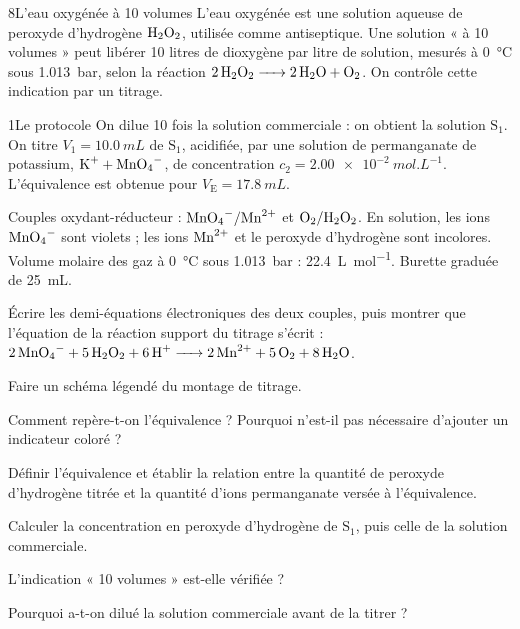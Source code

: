 

\begin{exoBac}{8}{L'eau oxygénée à 10 volumes}
L'eau oxygénée est une solution aqueuse de peroxyde d'hydrogène $\ce{H2O2}$, utilisée comme antiseptique. Une solution « à 10
volumes » peut libérer 10 litres de dioxygène par litre de solution, mesurés à \qty{0}{\degreeCelsius} sous \qty{1,013}{bar}, selon la réaction
$\ce{2 H2O2 -> 2 H2O + O2}$. On contrôle cette indication par un titrage.
\begin{docu}{1}{Le protocole}
On dilue 10 fois la solution commerciale : on obtient la solution $\mathrm{S_1}$. On titre $V_1=\qty{10,0}{mL}$ de $\mathrm{S_1}$, acidifiée, par une
solution de permanganate de potassium, $\ce{K+}+\ce{MnO4-}$, de concentration $c_2=\qty{2,00e-2}{mol.L^{-1}}$. L'équivalence est obtenue
pour $V_\mathrm{E}=\qty{17,8}{mL}$.
\end{docu}
\begin{donnees}
Couples oxydant-réducteur : $\ce{MnO4-}/\ce{Mn^{2+}}$ et $\ce{O2}/\ce{H2O2}$. En solution, les ions $\ce{MnO4-}$ sont violets ; les ions
$\ce{Mn^{2+}}$ et le peroxyde d'hydrogène sont incolores. Volume molaire des gaz à \qty{0}{\degreeCelsius} sous \qty{1,013}{bar} : \qty{22,4}{L.mol^{-1}}.
Burette graduée de \qty{25}{mL}.
\end{donnees}
\begin{questions}
\item Écrire les demi-équations électroniques des deux couples, puis montrer que l'équation de la réaction support du titrage
s'écrit : $\ce{2 MnO4- + 5 H2O2 + 6 H+ -> 2 Mn^{2+} + 5 O2 + 8 H2O}$.
\item Faire un schéma légendé du montage de titrage.
\item Comment repère-t-on l'équivalence ? Pourquoi n'est-il pas nécessaire d'ajouter un indicateur coloré ?
\item Définir l'équivalence et établir la relation entre la quantité de peroxyde d'hydrogène titrée et la quantité d'ions
permanganate versée à l'équivalence.
\item Calculer la concentration en peroxyde d'hydrogène de $\mathrm{S_1}$, puis celle de la solution commerciale.
\item \initiative L'indication « 10 volumes » est-elle vérifiée ?
\item Pourquoi a-t-on dilué la solution commerciale avant de la titrer ?
\end{questions}
\end{exoBac}

